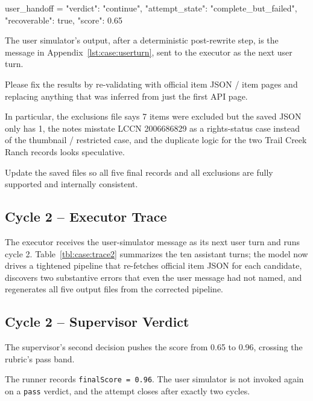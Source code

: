 \begin{clawcode}[title={\texttt{user\_handoff} (cycle 1)},label={lst:case:handoff}]
user_handoff = {
    "verdict":        "continue",
    "attempt_state":  "complete_but_failed",
    "recoverable":    true,
    "score":          0.65
}
\end{clawcode}

The user simulator's output, after a deterministic post-rewrite step,
is the message in Appendix~\ref{lst:case:userturn}, sent to the
executor as the next user turn.

\begin{clawcode}[title={Cycle 1 user simulator follow-up (verbatim)},label={lst:case:userturn}]
Please fix the results by re-validating with official item JSON /
item pages and replacing anything that was inferred from just the
first API page.

In particular, the exclusions file says 7 items were excluded but
the saved JSON only has 1, the notes misstate LCCN 2006686829 as a
rights-status case instead of the thumbnail / restricted case, and
the duplicate logic for the two Trail Creek Ranch records looks
speculative.

Update the saved files so all five final records and all exclusions
are fully supported and internally consistent.
\end{clawcode}

\subsection{Cycle 2 -- Executor Trace}\label{app:case-study:trace2}

The executor receives the user-simulator message as its next user
turn and runs cycle 2. Table~\ref{tbl:case:trace2} summarizes the
ten assistant turns; the model now drives a tightened pipeline that
re-fetches official item JSON for each candidate, discovers two
substantive errors that even the user message had not named, and
regenerates all five output files from the corrected pipeline.

\subsection{Cycle 2 -- Supervisor Verdict}\label{app:case-study:verdict2}

The supervisor's second decision pushes the score from 0.65 to 0.96,
crossing the rubric's pass band.

The runner records \texttt{finalScore = 0.96}. The user simulator is
not invoked again on a \texttt{pass} verdict, and the attempt closes
after exactly two cycles.

